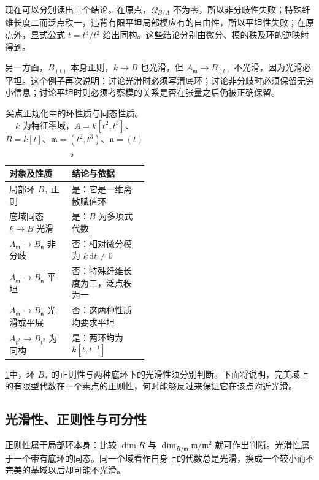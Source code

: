 现在可以分别读出三个结论。在原点，\(\Omega_{B/A}\) 不为零，所以非分歧性失败；特殊纤维长度二而泛点秩一，违背有限平坦局部模应有的自由性，所以平坦性失败；在原点外，显式公式 \(t=t^3/t^2\) 给出同构。这些结论分别由微分、模的秩及环的逆映射得到。

\ProseParagraphBreak
另一方面，\(B_{(t)}\) 本身正则，\(k\to B\) 也光滑，但 \(A_{\mathfrak m}\to B_{(t)}\) 不光滑，因为光滑必平坦。这个例子再次说明：讨论光滑时必须写清底环；讨论非分歧时必须保留无穷小信息；讨论平坦时则必须考察模的关系是否在张量之后仍被正确保留。

\begin{table}[htbp]
	\centering
	\caption[尖点正规化中的环性质与同态性质]{尖点正规化中的环性质与同态性质。\(k\) 为特征零域，\(A=k[t^2,t^3]\)、\(B=k[t]\)、\(\mathfrak m=(t^2,t^3)\)、\(\mathfrak n=(t)\)。}
	\label{b3:tab:cusp-ring-and-map-properties}
	\begin{tabularx}{\linewidth}{@{}>{\raggedright\arraybackslash}p{0.45\linewidth}X@{}}
		\toprule
		对象及性质 & 结论与依据 \\
		\midrule
		局部环 \(B_{\mathfrak n}\) 正则 & 是：它是一维离散赋值环 \\
		底域同态 \(k\rightarrow B\) 光滑 & 是：\(B\) 为多项式代数 \\
		\(A_{\mathfrak m}\rightarrow B_{\mathfrak n}\) 非分歧 & 否：相对微分模为 \(k\,\mathrm dt\ne0\) \\
		\(A_{\mathfrak m}\rightarrow B_{\mathfrak n}\) 平坦 & 否：特殊纤维长度为二，泛点秩为一 \\
		\(A_{\mathfrak m}\rightarrow B_{\mathfrak n}\) 光滑或平展 & 否：这两种性质均要求平坦 \\
		\(A_{t^2}\rightarrow B_{t^2}\) 为同构 & 是：两环均为 \(k[t,t^{-1}]\) \\
		\bottomrule
	\end{tabularx}
\end{table}

\cref{b3:tab:cusp-ring-and-map-properties}中，环 \(B_{\mathfrak n}\) 的正则性与两种底环下的光滑性须分别判断。下面将说明，完美域上的有限型代数在一个素点的正则性，何时能够反过来保证它在该点附近光滑。

\subsection{光滑性、正则性与可分性}
\label{b3:subsec:2304:02}
\label{b3:subsec:regular-smooth-separability}

正则性属于局部环本身：比较 \(\dim R\) 与 \(\dim_{R/\mathfrak m}\mathfrak m/\mathfrak m^2\) 就可作出判断。光滑性属于一个带有底环的同态。同一个域看作自身上的代数总是光滑，换成一个较小而不完美的基域以后却可能不光滑。


